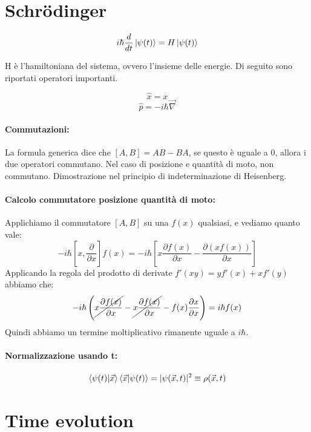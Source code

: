 \section{Schr\"{o}dinger}

$$i\hbar\frac{d}{dt}\ket{\psi(t)} = H\ket{\psi(t)}$$

\noindent H è l'hamiltoniana del sistema, ovvero l'insieme delle energie. Di seguito sono riportati operatori importanti.

$$\hat{x} = x$$ $$\hat{p} = -i\hbar\vec{\nabla}$$

\paragraph{Commutazioni:}
La formula generica dice che $[A, B] = AB - BA$, se questo è uguale a 0, allora i due operatori commutano. Nel caso di posizione e quantità di moto, non commutano. Dimostrazione nel principio di indeterminazione di Heisenberg.

\paragraph{Calcolo commutatore posizione quantità di moto:}
Applichiamo il commutatore $[A, B]$ su una $f(x)$ qualsiasi, e vediamo quanto vale:
$$-i\hbar\left[x, \frac{\partial}{\partial x}\right] f(x) = -i\hbar\left[x\frac{\partial f(x)}{\partial x} - \frac{\partial (xf(x))}{\partial x}\right]$$
Applicando la regola del prodotto di derivate $f'(xy) = yf'(x) + xf'(y)$ abbiamo che: 
$$-i\hbar\left( \cancel{x\frac{\partial f(x)}{\partial x}} - \cancel{x \frac{\partial f(x)}{\partial x}} - f(x)\frac{\partial x}{\partial x}\right) = i\hbar f(x)$$
Quindi abbiamo un termine moltiplicativo rimanente uguale a $i\hbar$.

\paragraph{Normalizzazione usando t:}
$$\braket{\psi(t)|\vec{x}}\braket{\vec{x}|\psi(t)} = |\psi(\vec{x}, t)|^2 \equiv \rho(\vec{x}, t)$$

\section{Time evolution}

